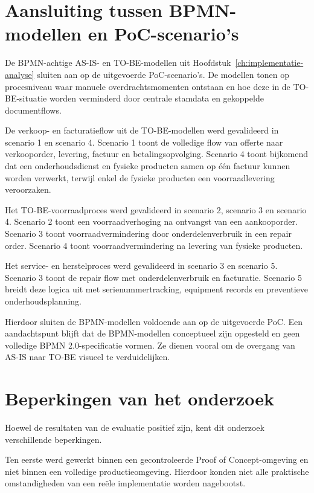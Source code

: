 \section{Aansluiting tussen BPMN-modellen en PoC-scenario's}
\label{sec:bpmn-poc-aansluiting}

De BPMN-achtige AS-IS- en TO-BE-modellen uit Hoofdstuk~\ref{ch:implementatie-analyse} sluiten aan op de uitgevoerde PoC-scenario's. De modellen tonen op procesniveau waar manuele overdrachtsmomenten ontstaan en hoe deze in de TO-BE-situatie worden verminderd door centrale stamdata en gekoppelde documentflows.

De verkoop- en facturatieflow uit de TO-BE-modellen werd gevalideerd in scenario 1 en scenario 4. Scenario 1 toont de volledige flow van offerte naar verkooporder, levering, factuur en betalingsopvolging. Scenario 4 toont bijkomend dat een onderhoudsdienst en fysieke producten samen op één factuur kunnen worden verwerkt, terwijl enkel de fysieke producten een voorraadlevering veroorzaken.

Het TO-BE-voorraadproces werd gevalideerd in scenario 2, scenario 3 en scenario 4. Scenario 2 toont een voorraadverhoging na ontvangst van een aankooporder. Scenario 3 toont voorraadvermindering door onderdelenverbruik in een repair order. Scenario 4 toont voorraadvermindering na levering van fysieke producten.

Het service- en herstelproces werd gevalideerd in scenario 3 en scenario 5. Scenario 3 toont de repair flow met onderdelenverbruik en facturatie. Scenario 5 breidt deze logica uit met serienummertracking, equipment records en preventieve onderhoudsplanning.

Hierdoor sluiten de BPMN-modellen voldoende aan op de uitgevoerde PoC. Een aandachtspunt blijft dat de BPMN-modellen conceptueel zijn opgesteld en geen volledige BPMN 2.0-specificatie vormen. Ze dienen vooral om de overgang van AS-IS naar TO-BE visueel te verduidelijken.

\section{Beperkingen van het onderzoek}
\label{sec:beperkingen}

Hoewel de resultaten van de evaluatie positief zijn, kent dit onderzoek verschillende beperkingen.

Ten eerste werd gewerkt binnen een gecontroleerde Proof of Concept-omgeving en niet binnen een volledige productieomgeving. Hierdoor konden niet alle praktische omstandigheden van een reële implementatie worden nagebootst.

